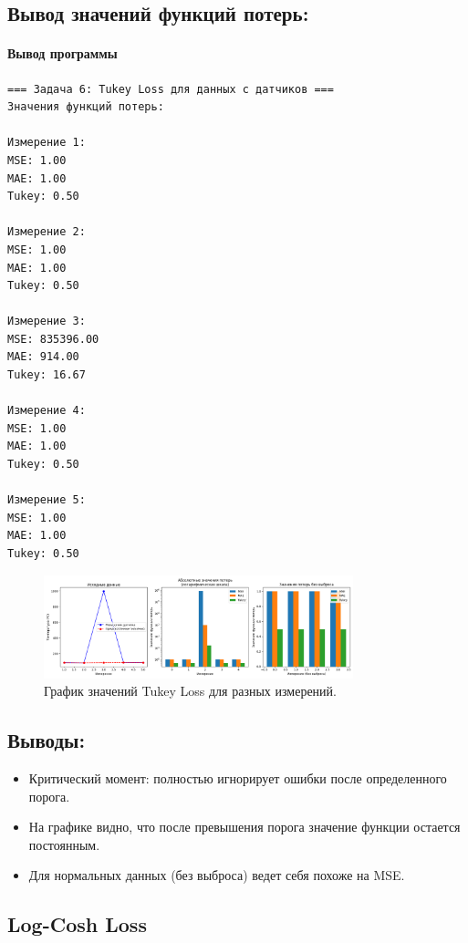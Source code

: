 \subsection*{Вывод значений функций потерь:}
\paragraph{Вывод программы}
\begin{verbatim}
=== Задача 6: Tukey Loss для данных с датчиков ===
Значения функций потерь:

Измерение 1:
MSE: 1.00
MAE: 1.00
Tukey: 0.50

Измерение 2:
MSE: 1.00
MAE: 1.00
Tukey: 0.50

Измерение 3:
MSE: 835396.00
MAE: 914.00
Tukey: 16.67

Измерение 4:
MSE: 1.00
MAE: 1.00
Tukey: 0.50

Измерение 5:
MSE: 1.00
MAE: 1.00
Tukey: 0.50
\end{verbatim}

\begin{figure}[h!]
    \centering
    \includegraphics[width=0.8\textwidth]{chapters/general/imgs/tukey.png}
    \caption{График значений Tukey Loss для разных измерений.}
\end{figure}

\subsection*{Выводы:}
\begin{itemize}
    \item Критический момент: полностью игнорирует ошибки после определенного порога.
    \item На графике видно, что после превышения порога значение функции остается постоянным.
    \item Для нормальных данных (без выброса) ведет себя похоже на MSE.
\end{itemize}

\subsection{Log-Cosh Loss}

